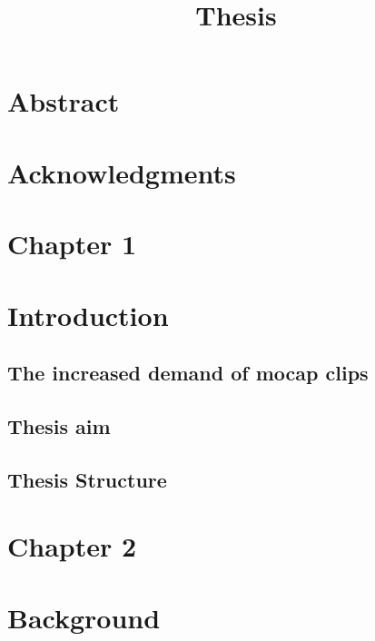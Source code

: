 \documentclass[12pt,oneside,a4paper,english]{article}
\title{Thesis} %
\begin{document}

\newpage
\doublespacing

\renewcommand{\baselinestretch}{1}\normalsize

\tableofcontents
\newpage
\listoffigures

\renewcommand{\baselinestretch}{1}\normalsize
\singlespacing
\thispagestyle{fancy} %
\newpage
{} 

\newpage
\addtocounter{section}{-1}
\section{Abstract}
\addtocounter{section}{-1}
\newpage
\section{Acknowledgments}

\newpage
\section*{Chapter 1 \\}
\section{Introduction}
\subsection{The increased demand of mocap clips}
 
\subsection{Thesis aim}
 
\subsection{Thesis Structure}
 

\newpage
\section*{Chapter 2 \\}
\section{Background}
\end{document}
